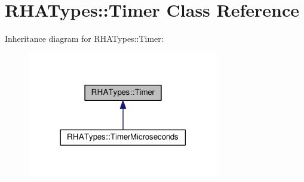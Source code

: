 \hypertarget{classRHATypes_1_1Timer}{}\section{R\+H\+A\+Types\+:\+:Timer Class Reference}
\label{classRHATypes_1_1Timer}


Inheritance diagram for R\+H\+A\+Types\+:\+:Timer\+:
\nopagebreak
\begin{figure}[H]
\begin{center}
\leavevmode
\includegraphics[width=237pt]{classRHATypes_1_1Timer__inherit__graph}
\end{center}
\end{figure}
